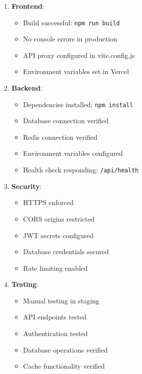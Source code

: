 \documentclass[12pt,a4paper]{report}
\begin{document}
\begin{enumerate}
    \item \textbf{Frontend}:
        \begin{itemize}
            \item Build successful: \texttt{npm run build}
            \item No console errors in production
            \item API proxy configured in vite.config.js
            \item Environment variables set in Vercel
        \end{itemize}
    
    \item \textbf{Backend}:
        \begin{itemize}
            \item Dependencies installed: \texttt{npm install}
            \item Database connection verified
            \item Redis connection verified
            \item Environment variables configured
            \item Health check responding: \texttt{/api/health}
        \end{itemize}
    
    \item \textbf{Security}:
        \begin{itemize}
            \item HTTPS enforced
            \item CORS origins restricted
            \item JWT secrets configured
            \item Database credentials secured
            \item Rate limiting enabled
        \end{itemize}
    
    \item \textbf{Testing}:
        \begin{itemize}
            \item Manual testing in staging
            \item API endpoints tested
            \item Authentication tested
            \item Database operations verified
            \item Cache functionality verified
        \end{itemize}
\end{enumerate}
\end{document}

